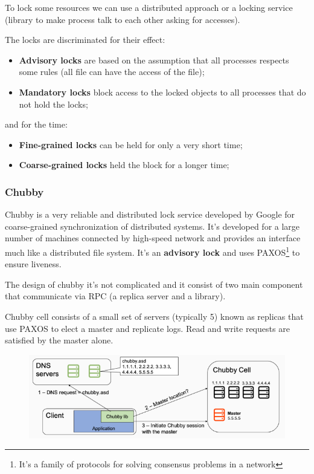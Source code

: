 To lock some resources we can use a distributed approach or a locking service (library to make process talk to each other asking for accesses).

The locks are discriminated for their effect:
\begin{itemize}
    \item \textbf{Advisory locks} are based on the assumption that all processes respects some rules (all file can have the access of the file);
    \item \textbf{Mandatory locks} block access to the locked objects to all processes that do not hold the locks;
\end{itemize}
and for the time:
\begin{itemize}
    \item \textbf{Fine-grained locks} can be held for only a very short time;
    \item \textbf{Coarse-grained locks} held the block for a longer time;
\end{itemize}


\subsubsection{Chubby}
Chubby is a very reliable and distributed lock service developed by Google for coarse-grained synchronization of distributed systems.
It's developed for a large number of machines connected by high-speed network and provides an interface much like a distributed file system.
It's an \textbf{advisory lock} and uses PAXOS\footnote{It's a family of protocols for solving consensus problems in a network} to ensure liveness.

The design of chubby it's not complicated and it consist of two main component that communicate via RPC (a replica server and a library).

Chubby cell consists of a small set of servers (typically 5) known as replicas that use PAXOS to elect a master and replicate logs. Read and write requests are satisfied by the master alone.
\begin{figure}[h!]
    \centering
    \includegraphics[scale=0.35]{images/chubbydesign.png}
\end{figure}

